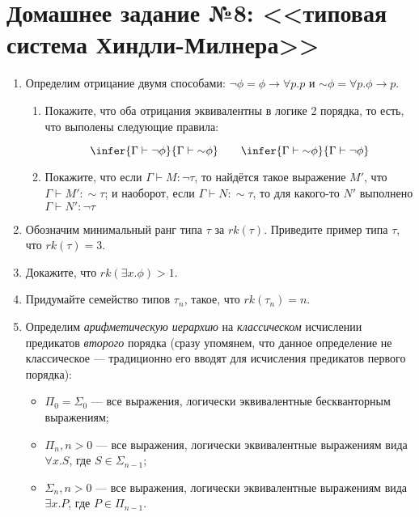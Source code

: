 \documentclass[10pt,a4paper,oneside]{article}
\begin{document}
\section*{Домашнее задание №8: <<типовая система Хиндли-Милнера>>}
\begin{enumerate}
\item Определим отрицание двумя способами: $\neg\phi = \phi\rightarrow\forall p.p$ и
${\sim}\phi = \forall p.\phi\rightarrow p$. 
\begin{enumerate}
\item Покажите, что оба отрицания эквивалентны в логике 2 порядка, то есть, что выполены следующие
правила:

$$\infer{\Gamma\vdash\neg\phi}{\Gamma\vdash{\sim}\phi} \quad\quad 
  \infer{\Gamma\vdash{\sim}\phi}{\Gamma\vdash\neg\phi}$$

\item Покажите, что если $\Gamma\vdash M:\neg\tau$, то найдётся такое выражение $M'$, что $\Gamma\vdash M':{\sim}\tau$;
и наоборот, если $\Gamma\vdash N:{\sim}\tau$, то для какого-то $N'$ выполнено $\Gamma\vdash N':\neg\tau$

\end{enumerate}
\item Обозначим минимальный ранг типа $\tau$ за $rk(\tau)$. Приведите пример типа $\tau$, что $rk(\tau) = 3$.

\item Докажите, что $rk(\exists x.\phi) > 1$.

\item Придумайте семейство типов $\tau_n$, такое, что $rk(\tau_n) = n$.

\item Определим \emph{арифметическую иерархию} на \emph{классическом} исчислении предикатов \emph{второго} 
порядка (сразу упомянем, что 
данное определение не классическое --- традиционно его вводят для исчисления предикатов первого порядка): 

\begin{itemize}
\item $\Pi_0 = \Sigma_0$ --- все выражения, логически эквивалентные бескванторным выражениям;
\item $\Pi_n, n > 0$ --- все выражения, логически эквивалентные выражениям вида $\forall x.S$, где $S \in \Sigma_{n-1}$;
\item $\Sigma_n, n > 0$ --- все выражения, логически эквивалентные выражениям вида $\exists x.P$, где $P \in \Pi_{n-1}$.
\end{itemize}


\end{enumerate}
\end{document}
